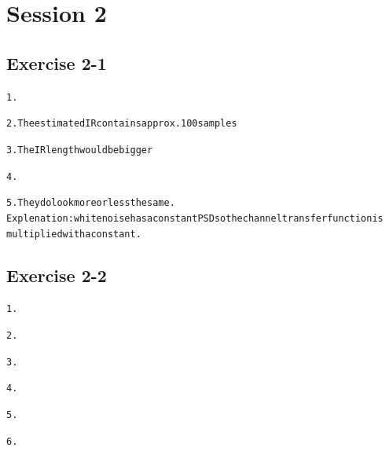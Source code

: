 \documentclass[a4paper,11pt]{article}
\begin{document}
\section{Session 2}
\subsection{Exercise 2-1}
\begin{alltt}
1.	

2.	The estimated IR contains approx. 100 samples

3.	The IR length would be bigger

4.	

5.	They do look more or less the same.
	Explenation: white noise has a constant PSD so the channel transferfunction is
	multiplied with a constant.

\end{alltt}
\subsection{Exercise 2-2}
\begin{alltt}
1.



2.	

3.

4.

5.

6.
\end{alltt}
\clearpage
\end{document}
